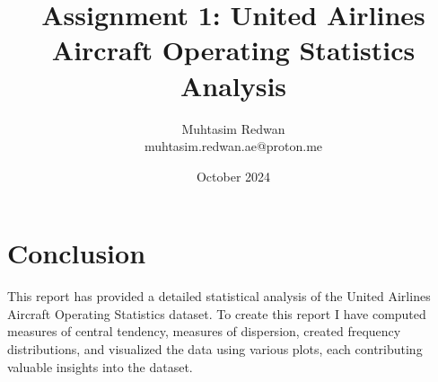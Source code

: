 \documentclass[a4paper,12pt]{article}
\title{Assignment 1: United Airlines Aircraft Operating Statistics Analysis}
\author{Muhtasim Redwan \\ muhtasim.redwan.ae@proton.me}
\date{October 2024}
\begin{document}

\maketitle







\section*{Conclusion}
This report has provided a detailed statistical analysis of the United Airlines Aircraft Operating Statistics dataset. To create this report I have computed measures of central tendency, measures of dispersion, created frequency distributions, and visualized the data using various plots, each contributing valuable insights into the dataset.
\end{document}
